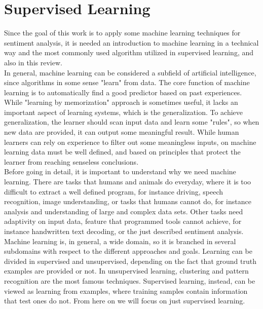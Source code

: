 \section{Supervised Learning}
Since the goal of this work is to apply some machine learning techniques for sentiment analysis, it is needed an introduction to machine learning in a technical way and the most commonly used algorithm utilized in supervised learning, and also in this review.\\
In general, machine learning can be considered a subfield of artificial intelligence, since algorithms in some sense "learn" from data. The core function of machine learning is to automatically find a good predictor based on past experiences. While "learning by memorization" approach is sometimes useful, it lacks an important aspect of learning systems, which is the generalization. To achieve generalization, the learner should scan input data and learn some "rules", so when new data are provided, it can output some meaningful result. While human learners can rely on experience to filter out some meaningless inputs, on machine learning data must be well defined, and based on principles that protect the learner from reaching senseless conclusions.\\
Before going in detail, it is important to understand why we need machine learning. There are tasks that humans and animals do everyday, where it is too difficult to extract a well defined program, for instance driving, speech recognition, image understanding, or tasks that humans cannot do, for instance analysis and understanding of large and complex data sets. Other tasks need adaptivity on input data, feature that programmed tools cannot achieve, for instance handwritten text decoding, or the just described sentiment analysis.\\
Machine learning is, in general, a wide domain, so it is branched in several subdomains with respect to the different approaches and goals. Learning can be divided in supervised and unsupervised, depending on the fact that ground truth examples are provided or not. In unsupervised learning, clustering and pattern recognition are the most famous techniques. Supervised learning, instead, can be viewed as learning from examples, where training samples contain information that test ones do not. From here on we will focus on just supervised learning.\\

